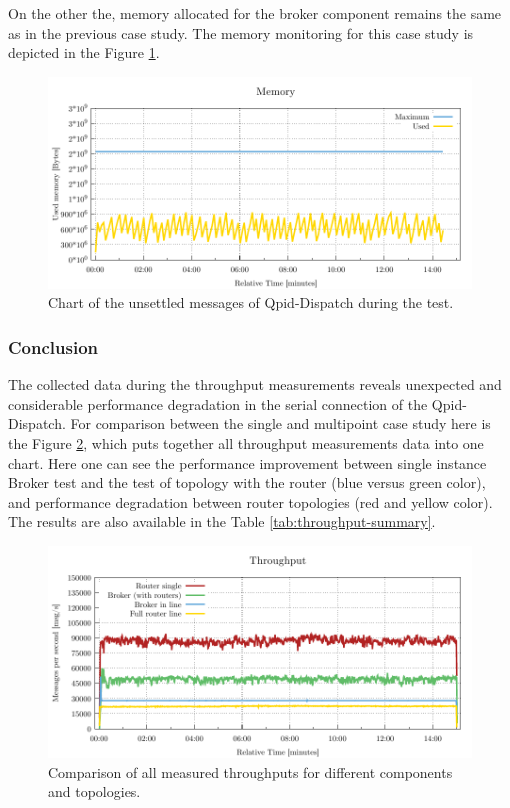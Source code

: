 On the other the, memory allocated for the broker component remains the same as in the previous case study. The memory monitoring for this case study is depicted in the Figure \ref{fig:broker-multipoint-memory}.

\begin{figure}[H]
	\centering
	\includegraphics[width=1\linewidth]{obrazky-figures/charts/multipoint-router-broker-throughput-memory.pdf}
	\caption{Chart of the unsettled messages of Qpid-Dispatch during the test.}
	\label{fig:broker-multipoint-memory}
\end{figure}


\subsubsection*{Conclusion}
The collected data during the throughput measurements reveals unexpected and considerable performance degradation in the serial connection of the Qpid-Dispatch. For comparison between the single and multipoint case study here is the Figure \ref{fig:basic-throughput-comparison}, which puts together all throughput measurements data into one chart. Here one can see the performance improvement between single instance Broker test and the test of topology with the router (blue versus green color), and performance degradation between router topologies (red and yellow color). The results are also available in the Table \ref{tab:throughput-summary}.

\begin{figure}[H]
	\centering
	\includegraphics[width=1\linewidth]{obrazky-figures/charts/basic-throughput.pdf}
	\caption{Comparison of all measured throughputs for different components and topologies.}
	\label{fig:basic-throughput-comparison}
\end{figure}

